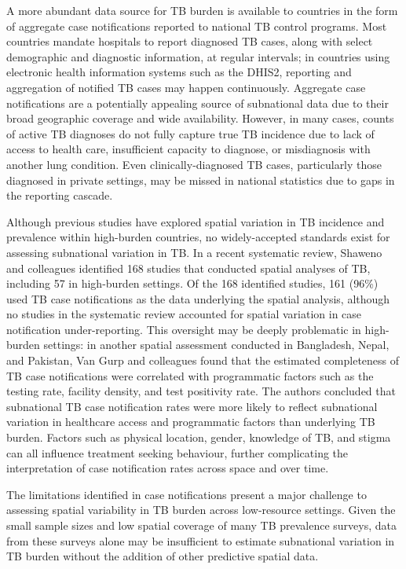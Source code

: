 \documentclass[
]{report}
\begin{document}
A more abundant data source for TB burden is available to countries in the form of aggregate case notifications reported to national TB control programs. Most countries mandate hospitals to report diagnosed TB cases, along with select demographic and diagnostic information, at regular intervals; in countries using electronic health information systems such as the DHIS2, reporting and aggregation of notified TB cases may happen continuously.\autocite{WorldHealthOrganization2020,Dehnavieh2019} Aggregate case notifications are a potentially appealing source of subnational data due to their broad geographic coverage and wide availability. However, in many cases, counts of active TB diagnoses do not fully capture true TB incidence due to lack of access to health care, insufficient capacity to diagnose, or misdiagnosis with another lung condition.\autocite{Karamagi2018} Even clinically-diagnosed TB cases, particularly those diagnosed in private settings, may be missed in national statistics due to gaps in the reporting cascade.\autocite{Glaziou2008,Glaziou2018a,Uplekar2016}

Although previous studies have explored spatial variation in TB incidence and prevalence within high-burden countries, no widely-accepted standards exist for assessing subnational variation in TB. In a recent systematic review, Shaweno and colleagues identified 168 studies that conducted spatial analyses of TB, including 57 in high-burden settings.\autocite{Shaweno2018} Of the 168 identified studies, 161 (96\%) used TB case notifications as the data underlying the spatial analysis, although no studies in the systematic review accounted for spatial variation in case notification under-reporting. This oversight may be deeply problematic in high-burden settings: in another spatial assessment conducted in Bangladesh, Nepal, and Pakistan, Van Gurp and colleagues found that the estimated completeness of TB case notifications were correlated with programmatic factors such as the testing rate, facility density, and test positivity rate.\autocite{VanGurp2020} The authors concluded that subnational TB case notification rates were more likely to reflect subnational variation in healthcare access and programmatic factors than underlying TB burden. Factors such as physical location, gender, knowledge of TB, and stigma can all influence treatment seeking behaviour,\autocite{Sudhakar2013,Abebe2010,Ahsan2004} further complicating the interpretation of case notification rates across space and over time.

The limitations identified in case notifications present a major challenge to assessing spatial variability in TB burden across low-resource settings. Given the small sample sizes and low spatial coverage of many TB prevalence surveys, data from these surveys alone may be insufficient to estimate subnational variation in TB burden without the addition of other predictive spatial data.
\end{document}
